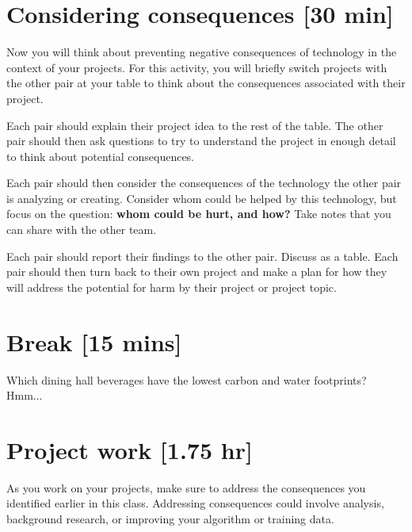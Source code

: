 \section{Considering consequences [30 min]}
Now you will think about preventing negative consequences of technology in the context of your projects. For this activity, you will briefly switch projects with the other pair at your table to think about the consequences associated with their project.
\be
\item [\textbf{10 min}] Each pair should explain their project idea to the rest of the table. The other pair should then ask questions to try to understand the  project in enough detail to think about potential consequences.
\item [\textbf{10 min}] Each pair should then consider the consequences of the technology the other pair is analyzing or creating. Consider whom could be helped by this technology, but focus on the question:  \textbf{whom could be hurt, and how?} Take notes that you can share with the other team.
\item [\textbf{10 min}] Each pair should report their findings to the other pair. Discuss as a table. Each pair should then turn back to their own project and make a plan for how they will address the potential for harm by their project or project topic.
\ee

\section{Break [15 mins]}

Which dining hall beverages have the lowest carbon and water footprints? Hmm...

\section{Project work [1.75 hr]}

As you work on your projects, make sure to address the consequences you identified earlier in this class. Addressing consequences could involve analysis, background research, or improving your algorithm or training data.
